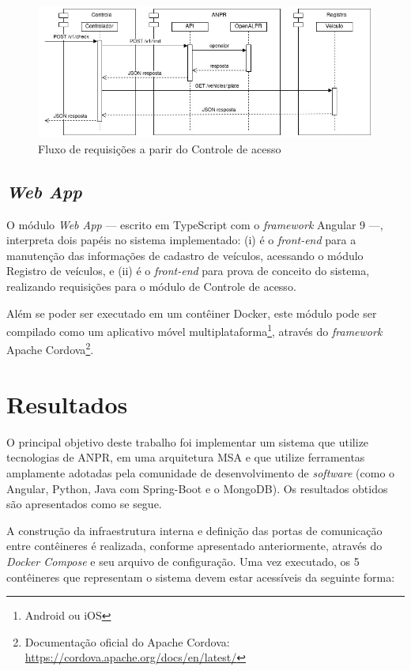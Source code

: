 \documentclass[12pt]{article}
\begin{document}
\begin{figure}[ht]
	\centering
	\includegraphics[width=1\textwidth]{check4j.jpg}
	\caption{Fluxo de requisições a parir do Controle de acesso}
	\label{fig:check4j}
\end{figure}

\subsection{\textit{Web App}}

O módulo \textit{Web App} — escrito em TypeScript com o \textit{framework} Angular 9 —, interpreta dois papéis no sistema implementado: (i) é o \textit{front-end} para a manutenção das informações de cadastro de veículos, acessando o módulo Registro de veículos, e (ii) é o \textit{front-end} para prova de conceito do sistema, realizando requisições para o módulo de Controle de acesso.

Além se poder ser executado em um contêiner Docker, este módulo pode ser compilado como um aplicativo móvel multiplataforma\footnote{Android ou iOS}, através do \textit{framework} Apache Cordova\footnote{Documentação oficial do Apache Cordova: \url{https://cordova.apache.org/docs/en/latest/}}.

\section{Resultados}

O principal objetivo deste trabalho foi implementar um sistema que utilize tecnologias de ANPR, em uma arquitetura MSA e que utilize ferramentas amplamente adotadas pela comunidade de desenvolvimento de \textit{software} (como o Angular, Python, Java com Spring-Boot e o MongoDB). Os resultados obtidos são apresentados como se segue.

A construção da infraestrutura interna e definição das portas de comunicação entre contêineres é realizada, conforme apresentado anteriormente, através do \textit{Docker Compose} e seu arquivo de configuração. Uma vez executado, os 5 contêineres que representam o sistema devem estar acessíveis da seguinte forma:
\end{document}
